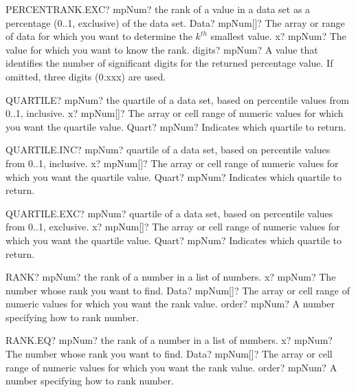 \documentclass[12pt,a4paper,openany]{book}
\begin{document}
\begin{mpFunctionsExtract}
\mpWorksheetFunctionThreeNotImplemented
{PERCENTRANK.EXC? mpNum? the rank of a value in a data set as a percentage (0..1, exclusive) of the data set.}
{Data? mpNum[]?  The array or range of data for which you want to determine the $k^{th}$ smallest  value.}
{x? mpNum? The value for which you want to know the rank.}
{digits? mpNum? A value that identifies the number of significant digits for the returned percentage value. If omitted, three digits (0.xxx) are used.}
\end{mpFunctionsExtract}

\begin{mpFunctionsExtract}
\mpWorksheetFunctionTwoNotImplemented
{QUARTILE? mpNum? the quartile of a data set, based on percentile values from 0..1, inclusive.}
{x? mpNum[]?  The array or cell range of numeric values for which you want the quartile value.}
{Quart? mpNum? Indicates which quartile to return.}
\end{mpFunctionsExtract}

\begin{mpFunctionsExtract}
\mpWorksheetFunctionTwoNotImplemented
{QUARTILE.INC? mpNum? quartile of a data set, based on percentile values from 0..1, inclusive.}
{x? mpNum[]?  The array or cell range of numeric values for which you want the quartile value.}
{Quart? mpNum? Indicates which quartile to return.}
\end{mpFunctionsExtract}

\begin{mpFunctionsExtract}
\mpWorksheetFunctionTwoNotImplemented
{QUARTILE.EXC? mpNum? quartile of a data set, based on percentile values from 0..1, exclusive.}
{x? mpNum[]?  The array or cell range of numeric values for which you want the quartile value.}
{Quart? mpNum? Indicates which quartile to return.}
\end{mpFunctionsExtract}

\begin{mpFunctionsExtract}
\mpWorksheetFunctionThreeNotImplemented
{RANK? mpNum? the rank of a number in a list of numbers.}
{x? mpNum? The number whose rank you want to find.}
{Data? mpNum[]?  The array or cell range of numeric values for which you want the rank value.}
{order? mpNum? A number specifying how to rank number.}
\end{mpFunctionsExtract}

\begin{mpFunctionsExtract}
\mpWorksheetFunctionThreeNotImplemented
{RANK.EQ? mpNum? the rank of a number in a list of numbers.}
{x? mpNum? The number whose rank you want to find.}
{Data? mpNum[]?  The array or cell range of numeric values for which you want the rank value.}
{order? mpNum? A number specifying how to rank number.}
\end{mpFunctionsExtract}
\end{document}
